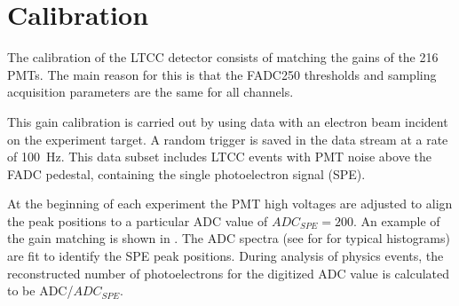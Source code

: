 \section{Calibration}

The calibration of the LTCC detector consists of matching the gains of the 216 PMTs. The main reason for this
is that the FADC250 thresholds and sampling acquisition parameters are the same for all channels.

This gain calibration is carried out by using data with an electron beam incident on the experiment target. A
random trigger is saved in the data stream at a rate of 100~Hz. This data subset includes LTCC events with
PMT noise above the FADC pedestal, containing the single photoelectron signal (SPE).

At the beginning of each experiment the PMT high voltages are adjusted to align the peak positions to a particular
ADC value of $ADC_{SPE} = 200$. An example of the gain matching is shown in . The ADC spectra
(see for  for typical histograms) are fit to identify the SPE peak positions. During analysis of
physics events, the reconstructed number of photoelectrons for the digitized ADC value is calculated to be
ADC/$ADC_{SPE}$.

